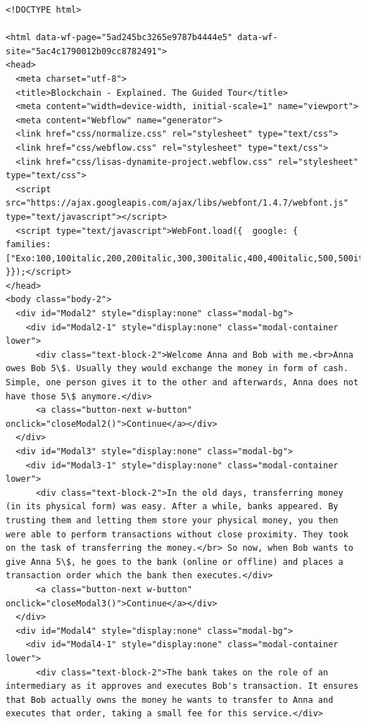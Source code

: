 \begin{lstlisting}
<!DOCTYPE html>

<html data-wf-page="5ad245bc3265e9787b4444e5" data-wf-site="5ac4c1790012b09cc8782491">
<head>
  <meta charset="utf-8">
  <title>Blockchain - Explained. The Guided Tour</title>
  <meta content="width=device-width, initial-scale=1" name="viewport">
  <meta content="Webflow" name="generator">
  <link href="css/normalize.css" rel="stylesheet" type="text/css">
  <link href="css/webflow.css" rel="stylesheet" type="text/css">
  <link href="css/lisas-dynamite-project.webflow.css" rel="stylesheet" type="text/css">
  <script src="https://ajax.googleapis.com/ajax/libs/webfont/1.4.7/webfont.js" type="text/javascript"></script>
  <script type="text/javascript">WebFont.load({  google: {    families: ["Exo:100,100italic,200,200italic,300,300italic,400,400italic,500,500italic,600,600italic,700,700italic,800,800italic,900,900italic","Roboto:100,100italic,300,300italic,regular,italic,500,500italic,700,700italic,900,900italic"]  }});</script>
</head>
<body class="body-2">
  <div id="Modal2" style="display:none" class="modal-bg">
    <div id="Modal2-1" style="display:none" class="modal-container lower">
      <div class="text-block-2">Welcome Anna and Bob with me.<br>Anna owes Bob 5\$. Usually they would exchange the money in form of cash. Simple, one person gives it to the other and afterwards, Anna does not have those 5\$ anymore.</div>
      <a class="button-next w-button" onclick="closeModal2()">Continue</a></div>
  </div>
  <div id="Modal3" style="display:none" class="modal-bg">
    <div id="Modal3-1" style="display:none" class="modal-container lower">
      <div class="text-block-2">In the old days, transferring money (in its physical form) was easy. After a while, banks appeared. By trusting them and letting them store your physical money, you then were able to perform transactions without close proximity. They took on the task of transferring the money.</br> So now, when Bob wants to give Anna 5\$, he goes to the bank (online or offline) and places a transaction order which the bank then executes.</div>
      <a class="button-next w-button" onclick="closeModal3()">Continue</a></div>
  </div>
  <div id="Modal4" style="display:none" class="modal-bg">
    <div id="Modal4-1" style="display:none" class="modal-container lower">
      <div class="text-block-2">The bank takes on the role of an intermediary as it approves and executes Bob's transaction. It ensures that Bob actually owns the money he wants to transfer to Anna and executes that order, taking a small fee for this service.</div>

\end{lstlisting}
